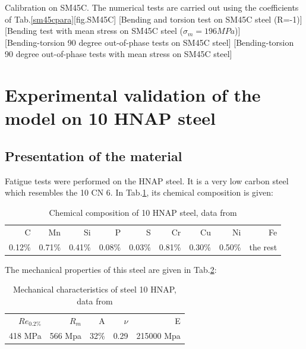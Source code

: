 \documentclass[3p,times,procedia,number]{elsarticle}
\begin{document}
\begin{Figure}[!h]{Calibration on  SM45C. The numerical tests are carried out using the coefficients of Tab.\ref{sm45cpara}}[fig.SM45C]
	[Bending and torsion test on SM45C steel (R=-1)]
	[Bending test with mean stress on SM45C steel ($\sigma_m=196 MPa$)]
	\\
	[Bending-torsion 90 degree out-of-phase tests on SM45C steel]
	[Bending-torsion 90 degree out-of-phase tests with mean stress on SM45C steel]
\end{Figure}


\clearpage
\section{Experimental validation of the model on 10 HNAP steel}
\subsection{Presentation of the material}
Fatigue tests were performed on the HNAP steel. It is a very low carbon steel
which resembles the 10 CN 6. In Tab.\ref{tab.10HNAPchem}, its chemical composition is given:	
\begin{table}[!h]
	\centering
	\begin{tabular}{rrrrrrrrr}
		\hline
		C      & Mn     & Si     & P      & S      & Cr     & Cu     & Ni     & Fe       \\
		0.12\% & 0.71\% & 0.41\% & 0.08\% & 0.03\% & 0.81\% & 0.30\% & 0.50\% & the rest \\ \hline
	\end{tabular}
	\caption{Chemical composition of 10 HNAP steel, data from \cite{Bedkowski1994}}
	\label{tab.10HNAPchem}
\end{table}
The mechanical properties of this steel are given in Tab.\ref{tab.10HNAPmec}:
\begin{table}[!h]
	\centering
	\begin{tabular}{rrrrr}
		\hline
		$Re_{0.2\%}$ & $R_m$   & A    & $\nu$ & E          \\
		418 MPa     & 566 Mpa & 32\% & 0.29  & 215000 Mpa \\ \hline
	\end{tabular}
	\caption{Mechanical characteristics of steel 10 HNAP, data from \cite{Bedkowski1994}}
	\label{tab.10HNAPmec}
\end{table}
\end{document}
